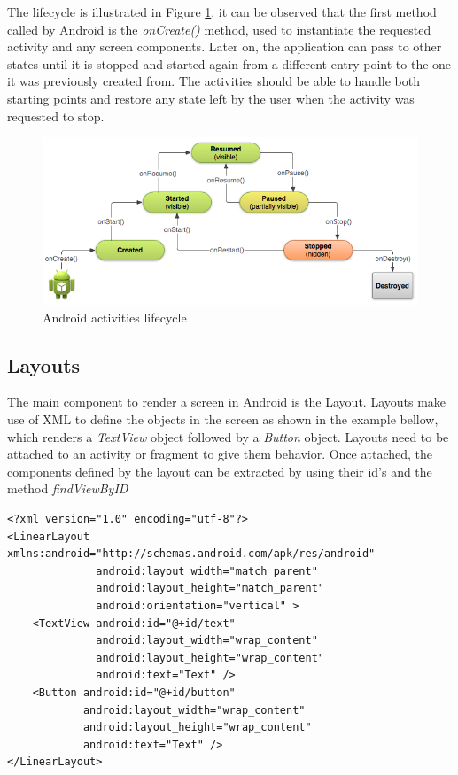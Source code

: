 The lifecycle is illustrated in Figure \ref{fig:activities_lifecycle}, it can be observed that the first method called by Android is the \textit{onCreate()} method, used to instantiate the requested activity and any screen components. Later on, the application can pass to other states until it is stopped and started again from a different entry point to the one it was previously created from. The activities should be able to handle both starting points and restore any state left by the user when the activity was requested to stop. 

\begin{figure}[H]
\begin{adjustbox}{width=1\textwidth,center=\textwidth}
  \centering
  \includegraphics[scale=1]{images/basic-lifecycle.png}
\end{adjustbox}
  \caption[Android activities lifecycle]{Android activities lifecycle\footnotemark}
  \label{fig:activities_lifecycle}
\end{figure}

\subsection{Layouts}
The main component to render a screen in Android is the Layout. Layouts make use of XML to define the objects in the screen as shown in the example bellow, which renders a \textit{TextView} object followed by a \textit{Button} object. Layouts need to be attached to an activity or fragment to give them behavior. Once attached, the components defined by the layout can be extracted by using their id's and the method \textit{findViewByID}

\begin{verbatim}
<?xml version="1.0" encoding="utf-8"?>
<LinearLayout xmlns:android="http://schemas.android.com/apk/res/android"
              android:layout_width="match_parent"
              android:layout_height="match_parent"
              android:orientation="vertical" >
    <TextView android:id="@+id/text"
              android:layout_width="wrap_content"
              android:layout_height="wrap_content"
              android:text="Text" />
    <Button android:id="@+id/button"
            android:layout_width="wrap_content"
            android:layout_height="wrap_content"
            android:text="Text" />
</LinearLayout>
\end{verbatim}

